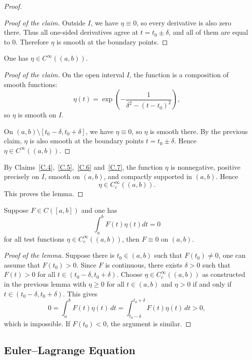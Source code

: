 ﻿\documentclass[12pt]{article}
\begin{document}
\begin{proof}
\begin{proof}[Proof of the claim]
Outside $I$, we have $\eta\equiv0$, so every derivative is also zero there. Thus all one-sided derivatives agree at $t = t_0 \pm \delta$, and all of them are equal to $0$. Therefore $\eta$ is smooth at the boundary points.
\end{proof}

\begin{claim}\label{C.7}
One has $\eta \in C^\infty((a, b))$.
\end{claim}

\begin{proof}[Proof of the claim]
On the open interval $I$, the function is a composition of smooth functions:
\[
 \eta(t) = \exp\left(-\frac{1}{\delta^2 - (t - t_0)^2}\right),
\]
so $\eta$ is smooth on $I$.

On $(a, b)\setminus [t_0 - \delta, t_0 + \delta]$, we have $\eta\equiv0$, so $\eta$ is smooth there. By the previous claim, $\eta$ is also smooth at the boundary points $t = t_0 \pm \delta$. Hence
$
 \eta \in C^\infty((a, b)).
$
\end{proof}
    By Claims~\ref{C.4},~\ref{C.5},~\ref{C.6} and~\ref{C.7}, the function $\eta$ is nonnegative, positive precisely on $I$, smooth on $(a, b)$, and compactly supported in $(a, b)$. Hence
\[
 \eta \in C_c^\infty((a, b)).
\]
This proves the lemma.
\end{proof}
    \begin{lemma}\label{FFL}
        Suppose $F \in C([a, b])$ and one has 
        \[ \int_a^b F(t)\eta(t)dt = 0
 \]
        for all test functions $\eta \in C_c^\infty((a, b))$, then $F \equiv 0$ on $(a, b)$.
    \end{lemma}
    \begin{proof}[Proof of the lemma]
        Suppose there is $t_0 \in (a, b)$ such that $F(t_0) \neq 0$, one can assume that $F(t_0) > 0$. Since $F$ is continuous, there exists $\delta > 0$ such that $F(t) > 0$ for all $t \in (t_0 - \delta, t_0 + \delta)$. Choose $\eta \in C_c^\infty((a, b))$ as constructed in the previous lemma with $\eta \geq 0$ for all $t \in (a, b)$ and $\eta > 0$ if and only if $t \in (t_0 - \delta, t_0 + \delta)$. This gives
            \[
 0 = \int_a^b F(t)\eta(t)\, dt = \int_{t_0 - \delta}^{t_0 + \delta}F(t)\eta(t)\, dt > 0,
 \]
            which is impossible.
        If $F(t_0) < 0$, the argument is similar.
    \end{proof}
\subsection{Euler--Lagrange Equation}\label{append1}
\end{document}
